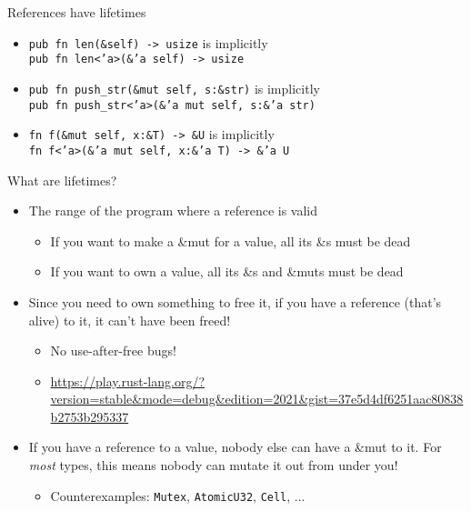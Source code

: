 \documentclass[aspectratio=169, notes]{beamer}
\begin{document}
\begin{frame}{References have lifetimes}
	\begin{itemize}
	\item \texttt{pub fn len(\textcolor{c3}{\&self}) -> usize} is implicitly \\
	\vspace{0.1in}
		\texttt{pub fn len<\textcolor{c2}{'a}>(\textcolor{c3}{\&\textcolor{c2}{'a} self}) -> usize}
	\vspace{0.4in}
	\item \texttt{pub fn push\_str(\textcolor{c3}{\&mut self}, s:\textcolor{c3}{\&}str)} is implicitly \\
	\vspace{0.1in}
		\texttt{pub fn push\_str<\textcolor{c2}{'a}>(\textcolor{c3}{\&\textcolor{c2}{'a} mut self}, s:\textcolor{c3}{\&}\textcolor{c2}{'a} str)}
	\vspace{0.4in}
	\item \texttt{fn f(\textcolor{c3}{\&mut self}, x:\textcolor{c3}{\&}T) -> \textcolor{c3}{\&}U} is implicitly \\
	\vspace{0.1in}
		\texttt{fn f<\textcolor{c2}{'a}>(\textcolor{c3}{\&\textcolor{c2}{'a} mut self}, x:\textcolor{c3}{\&}\textcolor{c2}{'a} T) -> \textcolor{c3}{\&}\textcolor{c2}{'a} U}
	\end{itemize}
\end{frame}

\begin{frame}{What are lifetimes?}
	\begin{itemize}
		\item<+-> The range of the program where a reference is valid
			\begin{itemize}
				\item If you want to make a \textcolor{c3}{\&mut} for a value, all its \textcolor{c3}{\&}s must be dead
				\item If you want to own a value, all its \textcolor{c3}{\&}s and \textcolor{c3}{\&mut}s must be dead
			\end{itemize}
		\vspace{0.2in}
		\item<+-> Since you need to own something to free it, if you have a reference (that's alive) to it, it can't have been freed!
			\begin{itemize}
				\item No use-after-free bugs!
				\item \url{https://play.rust-lang.org/?version=stable&mode=debug&edition=2021&gist=37e5d4df6251aac80838b2753b295337}
			\end{itemize}
		\vspace{0.2in}
		\item<+-> If you have a reference to a value, nobody else can have a \textcolor{c3}{\&mut} to it. For \emph{most} types, this means nobody can mutate it out from under you!
			\begin{itemize}
				\item Counterexamples: \texttt{Mutex}, \texttt{AtomicU32}, \texttt{Cell}, ...
			\end{itemize}
	\end{itemize}
\end{frame}
\end{document}
